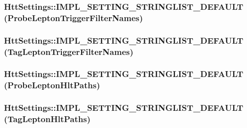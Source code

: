 \label{classHttSettings_a8daa9985fff6d954be88d243601b56f8}
\hypertarget{classHttSettings_ac90c3f148c23ca181d8337425966f405}{
\subsubsection[{IMPL\_\-SETTING\_\-STRINGLIST\_\-DEFAULT}]{\setlength{\rightskip}{0pt plus 5cm}HttSettings::IMPL\_\-SETTING\_\-STRINGLIST\_\-DEFAULT (ProbeLeptonTriggerFilterNames)}}
\label{classHttSettings_ac90c3f148c23ca181d8337425966f405}
\hypertarget{classHttSettings_a72c155dc0c66286049e0a96fc38d7d58}{
\subsubsection[{IMPL\_\-SETTING\_\-STRINGLIST\_\-DEFAULT}]{\setlength{\rightskip}{0pt plus 5cm}HttSettings::IMPL\_\-SETTING\_\-STRINGLIST\_\-DEFAULT (TagLeptonTriggerFilterNames)}}
\label{classHttSettings_a72c155dc0c66286049e0a96fc38d7d58}
\hypertarget{classHttSettings_a5c858d9a804965e10e80aaee3129ec7c}{
\subsubsection[{IMPL\_\-SETTING\_\-STRINGLIST\_\-DEFAULT}]{\setlength{\rightskip}{0pt plus 5cm}HttSettings::IMPL\_\-SETTING\_\-STRINGLIST\_\-DEFAULT (ProbeLeptonHltPaths)}}
\label{classHttSettings_a5c858d9a804965e10e80aaee3129ec7c}
\hypertarget{classHttSettings_adb48bb6048ea848b6bc172ece7304d2d}{
\subsubsection[{IMPL\_\-SETTING\_\-STRINGLIST\_\-DEFAULT}]{\setlength{\rightskip}{0pt plus 5cm}HttSettings::IMPL\_\-SETTING\_\-STRINGLIST\_\-DEFAULT (TagLeptonHltPaths)}}
